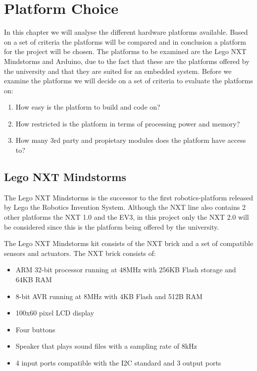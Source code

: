 \chapter{Platform Choice}

In this chapter we will analyse the different hardware platforms available.
Based on a set of criteria the platforms will be compared and in conclusion a
platform for the project will be chosen. The platforms to be examined are the
Lego NXT Mindstorms and Arduino, due to the fact that these are the
platforms offered by the university and that they are suited for an embedded
system. Before we examine the platforms we will decide on a set of criteria to
evaluate the platforms on:

\begin{enumerate}
  \item How easy is the platform to build and code on?
  \item How restricted is the platform in terms of processing power and memory?
  \item How many 3rd party and propietary modules does the platform have access
  to?
\end{enumerate}

\section{Lego NXT Mindstorms}
The Lego NXT Mindstorms is the successor to the first robotics-platform
released by Lego the Robotics Invention System. Although the NXT line also
contains 2 other platforms the NXT 1.0 and the EV3, in this project only the
NXT 2.0 will be considered since this is the platform being offered by the
university.\nl

The Lego NXT Mindstorms kit consists of the NXT brick and a set of
compatible sensors and actuators. The NXT brick\citep[P.70]{NXTStats} consists
of:

\begin{itemize}
  \item ARM 32-bit processor running at 48MHz with 256KB Flash storage and 64KB RAM
  \item 8-bit AVR running at 8MHz with 4KB Flash and 512B RAM
  \item 100x60 pixel LCD display
  \item Four buttons
  \item Speaker that plays sound files with a sampling rate of 8kHz
  \item 4 input ports compatible with the I2C standard and 3 output ports
\end{itemize}

